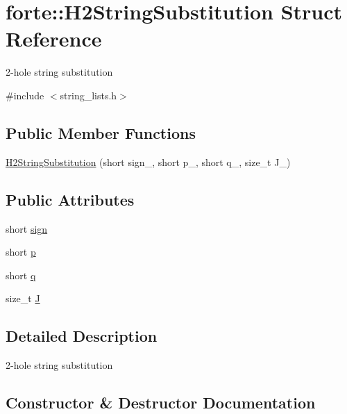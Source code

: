 \hypertarget{structforte_1_1_h2_string_substitution}{}\section{forte\+:\+:H2\+String\+Substitution Struct Reference}
\label{structforte_1_1_h2_string_substitution}


2-\/hole string substitution  




{\ttfamily \#include $<$string\+\_\+lists.\+h$>$}

\subsection*{Public Member Functions}
\begin{DoxyCompactItemize}
\item 
\mbox{\hyperlink{structforte_1_1_h2_string_substitution_a255a17320a4d4af4b7f2b22deee8a28a}{H2\+String\+Substitution}} (short sign\+\_\+, short p\+\_\+, short q\+\_\+, size\+\_\+t J\+\_\+)
\end{DoxyCompactItemize}
\subsection*{Public Attributes}
\begin{DoxyCompactItemize}
\item 
short \mbox{\hyperlink{structforte_1_1_h2_string_substitution_a4ab39d34fb4783efa13cee6d71663cd6}{sign}}
\item 
short \mbox{\hyperlink{structforte_1_1_h2_string_substitution_ae0dab96a63f00289df561877314675ed}{p}}
\item 
short \mbox{\hyperlink{structforte_1_1_h2_string_substitution_a0a37573e3bd16a4dc8b473b11277aac7}{q}}
\item 
size\+\_\+t \mbox{\hyperlink{structforte_1_1_h2_string_substitution_a51a04d5b90bc4579a847867a6fa9bc5e}{J}}
\end{DoxyCompactItemize}


\subsection{Detailed Description}
2-\/hole string substitution 

\subsection{Constructor \& Destructor Documentation}
\mbox{\label{structforte_1_1_h2_string_substitution_a255a17320a4d4af4b7f2b22deee8a28a}} 
